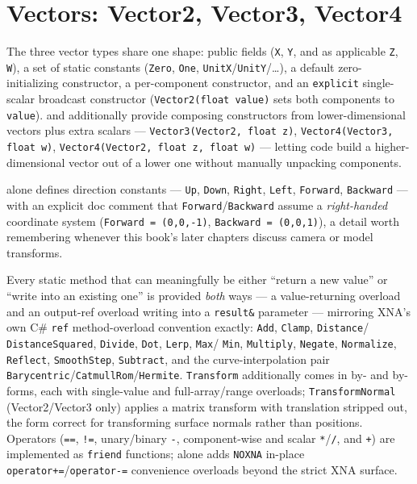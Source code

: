 \section{Vectors: Vector2, Vector3, Vector4}

The three vector types share one shape: public fields (\texttt{X}, \texttt{Y}, and as
applicable \texttt{Z}, \texttt{W}), a set of static constants (\texttt{Zero}, \texttt{One},
\texttt{UnitX}/\texttt{UnitY}/\ldots), a default zero-initializing constructor, a per-component
constructor, and an \texttt{explicit} single-scalar broadcast constructor
(\texttt{Vector2(float value)} sets both components to \texttt{value}).  and
 additionally provide composing constructors from lower-dimensional vectors
plus extra scalars --- \texttt{Vector3(Vector2, float z)}, \texttt{Vector4(Vector3, float w)},
\texttt{Vector4(Vector2, float z, float w)} --- letting code build a higher-dimensional
vector out of a lower one without manually unpacking components.

 alone defines direction constants --- \texttt{Up}, \texttt{Down},
\texttt{Right}, \texttt{Left}, \texttt{Forward}, \texttt{Backward} --- with an explicit doc
comment that \texttt{Forward}/\texttt{Backward} assume a \emph{right-handed} coordinate
system (\texttt{Forward = (0,0,-1)}, \texttt{Backward = (0,0,1)}), a detail worth remembering
whenever this book's later chapters discuss camera or model transforms.

Every static method that can meaningfully be either ``return a new value'' or ``write into an
existing one'' is provided \emph{both} ways --- a value-returning overload and an output-ref
overload writing into a \texttt{result\&} parameter --- mirroring XNA's own C\# \texttt{ref}
method-overload convention exactly: \texttt{Add}, \texttt{Clamp}, \texttt{Distance}/%
\texttt{DistanceSquared}, \texttt{Divide}, \texttt{Dot}, \texttt{Lerp}, \texttt{Max}/%
\texttt{Min}, \texttt{Multiply}, \texttt{Negate}, \texttt{Normalize}, \texttt{Reflect},
\texttt{SmoothStep}, \texttt{Subtract}, and the curve-interpolation pair
\texttt{Barycentric}/\texttt{CatmullRom}/\texttt{Hermite}. \texttt{Transform} additionally
comes in by- and by- forms, each with single-value and
full-array/range overloads; \texttt{TransformNormal} (Vector2/Vector3 only) applies a matrix
transform with translation stripped out, the form correct for transforming surface normals
rather than positions. Operators (\texttt{==}, \texttt{!=}, unary/binary \texttt{-},
component-wise and scalar \texttt{*}/\texttt{/}, and \texttt{+}) are implemented as
\texttt{friend} functions;  alone adds \texttt{NOXNA} in-place
\texttt{operator+=}/\texttt{operator-=} convenience overloads beyond the strict XNA surface.

